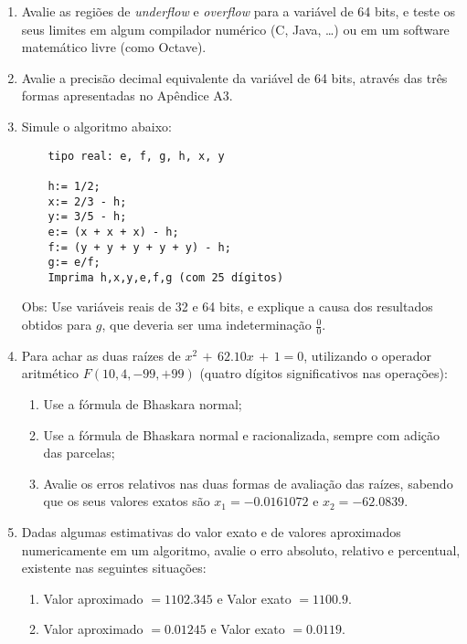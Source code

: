 \documentclass[12pt]{article}
\newenvironment{smallitem}{
    \vspace{-2mm}
    \begin{enumerate}
    \setlength{\parskip}{0pt}
    \setlength{\itemsep}{2pt}
}{
    \vspace{-2mm}
    \end{enumerate}
}
\begin{document}
\begin{enumerate}[label=\textbf{\arabic*})]
\item Avalie as regiões de \textit{underflow} e \textit{overflow} para a
variável de 64 bits, e teste os seus limites em algum compilador numérico (C,
Java, \dots) ou em um software matemático livre (como Octave).

\item Avalie a precisão decimal equivalente da variável de 64 bits, através das
três formas apresentadas no Apêndice A3.

\item Simule o algoritmo abaixo:
\begin{verbatim}
    tipo real: e, f, g, h, x, y

    h:= 1/2;
    x:= 2/3 - h;
    y:= 3/5 - h;
    e:= (x + x + x) - h;
    f:= (y + y + y + y + y) - h;
    g:= e/f;
    Imprima h,x,y,e,f,g (com 25 dígitos)\end{verbatim}
Obs: Use variáveis reais de 32 e 64 bits, e explique a causa dos resultados
obtidos para $g$, que deveria ser uma indeterminação $\frac{0}{0}$.

\item Para achar as duas raízes de $x^2 \, + \, 62.10x \, + \, 1 = 0$,
utilizando o operador aritmético $F(10, 4, -99, +99)$ (quatro dígitos
significativos nas operações):

\begin{smallitem}

\item Use a fórmula de Bhaskara normal;

\item Use a fórmula de Bhaskara normal e racionalizada, sempre com adição das
parcelas;

\item Avalie os erros relativos nas duas formas de avaliação das raízes, sabendo
que os seus valores exatos são $x_1 = -0.0161072$ e $x_2 = - 62.0839$.

\end{smallitem}

\item Dadas algumas estimativas do valor exato e de valores aproximados
numericamente em um algoritmo, avalie o erro absoluto, relativo e percentual,
existente nas seguintes situações:

\begin {smallitem}

\item Valor aproximado $= 1102.345$ e Valor exato $= 1100.9$.

\item Valor aproximado $= 0.01245$ e Valor exato $= 0.0119$.


\end{smallitem}
\end{enumerate}
\end{document}
